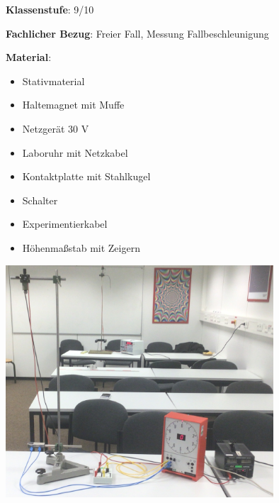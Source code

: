 \documentclass[../main.tex]{subfiles}
\begin{document}
\begin{tcolorbox}[
    width=\textwidth,
    height=\textheight,
    title=Versuch: Freier Fall,
    fonttitle=\Large,
    before title=\vspace{0.2cm}, after title=\vspace{0.2cm},
    colback=white,
    title filled=true, 
    colbacktitle=mygray,
    colframe=black,
    coltitle=black,
]
    
    \vspace{0.2cm}
\textbf{Klassenstufe}: 9/10

    \vspace{0.5cm}
    
    \textbf{Fachlicher Bezug}: Freier Fall, Messung Fallbeschleunigung
    
    \vspace{0.5cm}
    
    \begin{minipage}[]{0.45\textwidth}
        \textbf{Material}:
        \begin{itemize}[noitemsep]
            \item Stativmaterial
            \item Haltemagnet mit Muffe
            \item Netzgerät 30 V
            \item Laboruhr mit Netzkabel
            \item Kontaktplatte mit Stahlkugel
            \item Schalter
            \item Experimentierkabel
            \item Höhenmaßstab mit Zeigern
        \end{itemize}
    \end{minipage}
    \hspace{0.5cm}
    \begin{minipage}[]{0.5\textwidth}
        \includegraphics[width=0.75\textwidth]{img/versuchsaufbau}
    \end{minipage}


\end{tcolorbox}
\end{document}
